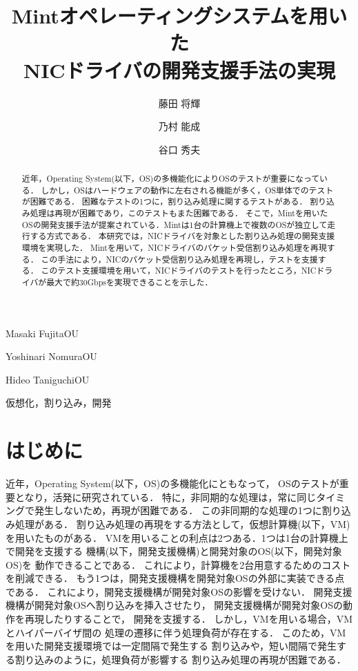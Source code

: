 \documentclass[submit,techreq,noauthor,dvipdfmx]{ipsj}
\begin{document}
\title{Mintオペレーティングシステムを用いた\\NICドライバの開発支援手法の実現}


\author{藤田 将輝}{Masaki Fujita}{OU}
\author{乃村 能成}{Yoshinari Nomura}{OU}
\author{谷口 秀夫}{Hideo Taniguchi}{OU}

\begin{abstract}

    近年，Operating System(以下，OS)の多機能化によりOSのテストが重要になっている．
    しかし，OSはハードウェアの動作に左右される機能が多く，OS単体でのテストが困難である．
    困難なテストの1つに，割り込み処理に関するテストがある．
    割り込み処理は再現が困難であり，このテストもまた困難である．
    そこで，Mintを用いたOSの開発支援手法が提案されている．Mintは1台の計算機上で複数のOSが独立して走行する方式である．
    本研究では，NICドライバを対象とした割り込み処理の開発支援環境を実現した．
    Mintを用いて，NICドライバのパケット受信割り込み処理を再現する．
    この手法により，NICのパケット受信割り込み処理を再現し，テストを支援する．
    このテスト支援環境を用いて，NICドライバのテストを行ったところ，NICドライバが最大で約30Gbpsを実現できることを示した．

\end{abstract}

\begin{jkeyword}
    仮想化，割り込み，開発
\end{jkeyword}
\maketitle

\section{はじめに}

近年，Operating System(以下，OS)の多機能化にともなって，
OSのテストが重要となり，活発に研究されている．
特に，非同期的な処理は，常に同じタイミングで発生しないため，再現が困難である．
この非同期的な処理の1つに割り込み処理がある．
割り込み処理の再現をする方法として，仮想計算機(以下，VM)を用いたものがある．
VMを用いることの利点は2つある．1つは1台の計算機上で開発を支援する
機構(以下，開発支援機構)と開発対象のOS(以下，開発対象OS)を
動作できることである．
これにより，計算機を2台用意するためのコストを削減できる．
もう1つは，開発支援機構を開発対象OSの外部に実装できる点である．
これにより，開発支援機構が開発対象OSの影響を受けない．
開発支援機構が開発対象OSへ割り込みを挿入させたり，
開発支援機構が開発対象OSの動作を再現したりすることで，
開発を支援する．
しかし，VMを用いる場合，VMとハイパーバイザ間の
処理の遷移に伴う処理負荷が存在する．
このため，VMを用いた開発支援環境では一定間隔で発生する
割り込みや，短い間隔で発生する割り込みのように，処理負荷が影響する
割り込み処理の再現が困難である．
\end{document}
